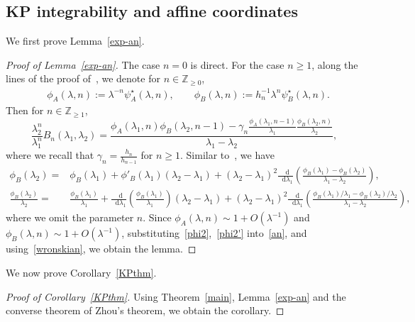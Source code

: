 \documentclass[a4paper]{article}
\theoremstyle{plain}
\theoremstyle{definition}
\newcommand{\dif}{\mathop{}\!\mathrm{d}}
\newcommand{\ZZ}{\mathbb{Z}}
\begin{document}
\subsection{KP integrability and affine coordinates} \label{sec-kp}

We first prove Lemma~\ref{exp-an}.

\begin{proof}[Proof of Lemma~\ref{exp-an}]
	The case $n=0$ is direct. For the case $n\ge1$, along the lines of the proof of~\cite[Lemma 4.4]{YZ}, we denote for $n\in\ZZ_{\ge0}$,
	\begin{align}
		&\phi_A(\lambda,n):=\lambda^{-n}\psi_A^\star(\lambda,n),\qquad\phi_B(\lambda,n):=h_n^{-1}\lambda^n\psi_B^\star(\lambda,n).
	\end{align}
	Then for $n\in\ZZ_{\ge1}$,
	\begin{equation}\label{an}
		\frac{\lambda_2^n}{\lambda_1^n}B_n(\lambda_1,\lambda_2)=\frac{\phi_A(\lambda_1,n)\phi_B(\lambda_2,n-1)-\gamma_n\frac{\phi_A(\lambda_1,n-1)}{\lambda_1}\frac{\phi_B(\lambda_2,n)}{\lambda_2}}{\lambda_1-\lambda_2},
	\end{equation}
	where we recall that $\gamma_n=\frac{h_n}{h_{n-1}}$ for $n\ge1$. Similar to~\cite{BDYds,DYZ,YZ}, we have
	\begin{align}
		\phi_B(\lambda_2)=&\phi_B(\lambda_1)+\phi'_B(\lambda_1)(\lambda_2-\lambda_1)+(\lambda_2-\lambda_1)^2\frac{\dif}{\dif\lambda_1}\left(\frac{\phi_B(\lambda_1)-\phi_B(\lambda_2)}{\lambda_1-\lambda_2}\right),\label{phi2}\\
		\frac{\phi_B(\lambda_2)}{\lambda_2}=&\frac{\phi_B(\lambda_1)}{\lambda_1}+\frac{\dif}{\dif\lambda_1}\left(\frac{\phi_B(\lambda_1)}{\lambda_1}\right)(\lambda_2-\lambda_1)+(\lambda_2-\lambda_1)^2\frac{\dif}{\dif\lambda_1}\left(\frac{\phi_B(\lambda_1)/\lambda_1-\phi_B(\lambda_2)/\lambda_2}{\lambda_1-\lambda_2}\right),\label{phi2'}
	\end{align} where we omit the parameter $n$. Since $\phi_A(\lambda,n)\sim1+O(\lambda^{-1})$ and $\phi_B(\lambda,n)\sim1+O(\lambda^{-1})$, substituting~\eqref{phi2},~\eqref{phi2'} into~\eqref{an}, and using~\eqref{wronskian}, we obtain the lemma.
\end{proof}

We now prove Corollary~\ref{KPthm}. 

\begin{proof}[Proof of Corollary~\ref{KPthm}]
	Using Theorem~\ref{main}, Lemma~\ref{exp-an} and the converse theorem of Zhou's theorem, we obtain the corollary.
\end{proof}
\end{document}
